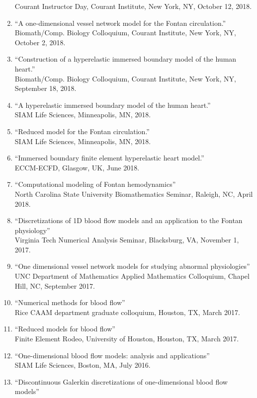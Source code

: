\documentclass{article} %
\begin{document}
\begin{enumerate}
Courant Instructor Day, Courant Institute, New York, NY, October 12, 2018.
\item ``A one-dimensional vessel network model for the Fontan circulation.'' \\Biomath/Comp. Biology Colloquium, Courant Institute, New York, NY, October 2, 2018.
\item ``Construction of a hyperelastic immersed boundary model of the human heart.'' \\Biomath/Comp. Biology Colloquium, Courant Institute, New York, NY, September 18, 2018.
\item ``A hyperelastic immersed boundary model of the human heart.''\\ SIAM Life Sciences, Minneapolis, MN, 2018.
\item ``Reduced model for the Fontan circulation.''\\ SIAM Life Sciences, Minneapolis, MN, 2018.
\item ``Immersed boundary finite element hyperelastic heart model.'' \\
ECCM-ECFD, Glasgow, UK, June 2018.
\item ``Computational modeling of Fontan hemodynamics'' \\
North Carolina State University Biomathematics Seminar, Raleigh, NC, April 2018.
\item ``Discretizations of 1D blood flow models and an application to the Fontan physiology'' \\
Virginia Tech Numerical Analysis Seminar, Blacksburg, VA, November 1, 2017.
\item ``One dimensional vessel network models for studying abnormal physiologies'' \\
UNC Department of Mathematics Applied Mathematics Colloquium, Chapel Hill, NC, September 2017.
\item ``Numerical methods for blood flow'' \\
Rice CAAM department graduate colloquium, Houston, TX, March 2017.
\item ``Reduced models for blood flow'' \\
Finite Element Rodeo, University of Houston, Houston, TX, March 2017.
\item ``One-dimensional blood flow models: analysis and applications'' \\
SIAM Life Sciences, Boston, MA, July 2016.
\item ``Discontinuous Galerkin discretizations of one-dimensional blood flow models'' \\ 

\end{enumerate}
\end{document}
